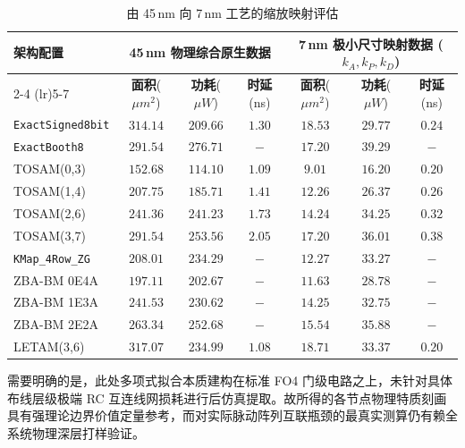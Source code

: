 \documentclass[12pt,a4paper,UTF8]{article}
\begin{document}
\begin{table}[htbp]
\centering
\caption{由 45\,nm 向 7\,nm 工艺的缩放映射评估}
\label{tab:7nm_mapped_ppa}
\small
\setlength{\tabcolsep}{5pt}
\begin{tabular}{lcccccc}
\toprule
\multirow{2}{*}{\textbf{架构配置}} & \multicolumn{3}{c}{\textbf{45\,nm 物理综合原生数据}} & \multicolumn{3}{c}{\textbf{7\,nm 极小尺寸映射数据} ($k_A, k_P, k_D$)} \\
\cmidrule(lr){2-4} \cmidrule(lr){5-7}
 & \textbf{面积}($\mu m^2$) & \textbf{功耗}($\mu W$) & \textbf{时延}(ns) & \textbf{面积}($\mu m^2$) & \textbf{功耗}($\mu W$) & \textbf{时延}(ns) \\
\midrule
\texttt{ExactSigned8bit}      & $314.14$ & $209.66$ & $1.30$ & $18.53$ & $29.77$ & $0.24$ \\
\texttt{ExactBooth8}  & $291.54$ & $276.71$ & $-$    & $17.20$ & $39.29$ & $-$    \\
\midrule
TOSAM(0,3)                    & $152.68$ & $114.10$ & $1.09$ & $9.01$  & $16.20$ & $0.20$ \\
TOSAM(1,4)                    & $207.75$ & $185.71$ & $1.41$ & $12.26$ & $26.37$ & $0.26$ \\
TOSAM(2,6)                    & $241.36$ & $241.23$ & $1.73$ & $14.24$ & $34.25$ & $0.32$ \\
TOSAM(3,7)                    & $291.54$ & $253.56$ & $2.05$ & $17.20$ & $36.01$ & $0.38$ \\
\midrule
\texttt{KMap\_4Row\_ZG} & $208.01$ & $234.29$ & $-$    & $12.27$ & $33.27$ & $-$    \\
ZBA-BM 0E4A                   & $197.11$ & $202.67$ & $-$    & $11.63$ & $28.78$ & $-$    \\
ZBA-BM 1E3A                   & $241.53$ & $230.62$ & $-$    & $14.25$ & $32.75$ & $-$    \\
ZBA-BM 2E2A                   & $263.34$ & $252.68$ & $-$    & $15.54$ & $35.88$ & $-$    \\
\midrule
LETAM(3,6)                    & $317.07$ & $234.99$ & $1.08$ & $18.71$ & $33.37$ & $0.20$ \\
\bottomrule
\end{tabular}
\end{table}

需要明确的是，此处多项式拟合本质建构在标准 FO4 门级电路之上，未针对具体布线层级极端 RC 互连线网损耗进行后仿真提取。故所得的各节点物理特质刻画具有强理论边界价值定量参考，而对实际脉动阵列互联瓶颈的最真实测算仍有赖全系统物理深层打样验证。
\end{document}
